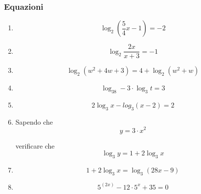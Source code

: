 \subsubsection{Equazioni}\label{subsec:equazioni}

\begin{enumerate}[label={Esercizio \arabic* },wide = 1cm, font =\bfseries]

\item 
\begin{equation*}
\log_2\left(\frac{5}{4}x-1\right)=-2
\end{equation*}

\item 
\begin{equation*}
\log_2\frac{2x}{x+3}=-1
\end{equation*}

\item 
\begin{equation*}
\log_2(w^2+4w+3)=4+\log_2(w^2+w)
\end{equation*}

\item \begin{equation*}
\log_38-3\cdot\log_3t=3
\end{equation*}

\item \begin{equation*}
2\log_3 x-log_3(x-2)=2
\end{equation*}


\item Sapendo che \begin{equation*}
y=3\cdot x^2
\end{equation*}

verificare che \begin{equation*}
\log_3 y = 1 + 2\log_3 x
\end{equation*}

\item \begin{equation*}
1+2\log_3 x = \log_3 (28x -9)
\end{equation*}


\item \begin{equation*}
5^{(2x)}-12\cdot 5^x + 35 = 0
\end{equation*}


\end{enumerate}
